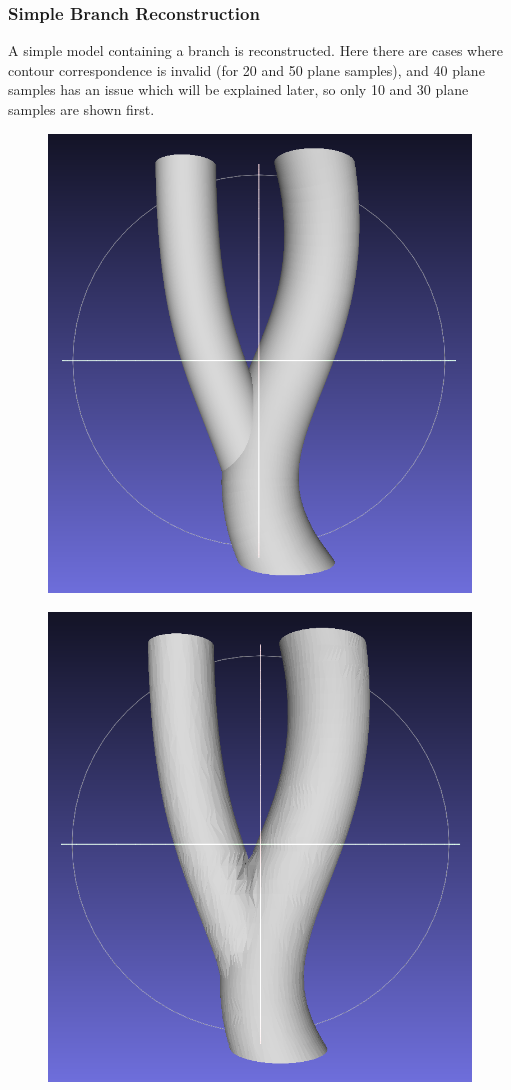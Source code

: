 \documentclass[11p, titlepage]{article}
\newcommand{\reconstructionleft}{0.3}
\newcommand{\reconstructionright}{0.67}
\begin{document}
\subsubsection{Simple Branch Reconstruction}

A simple model containing a branch is reconstructed. Here there are cases where contour correspondence is invalid (for 20 and 50 plane samples), and 40 plane samples has an issue which will be explained later, so only 10 and 30 plane samples are shown first.

\begin{figure}[h!]
     \centering
     \begin{minipage}[b]{\reconstructionleft\linewidth}
       {\includegraphics[width=\linewidth]{originals/simple-branch}}%
     \end{minipage}%
     \hfill
     \begin{minipage}[b]{\reconstructionright\linewidth}
       {\includegraphics[width=0.48\linewidth]{reconstructions/dtw-simple-branch-30}}%

\end{minipage}
\end{figure}
\end{document}
